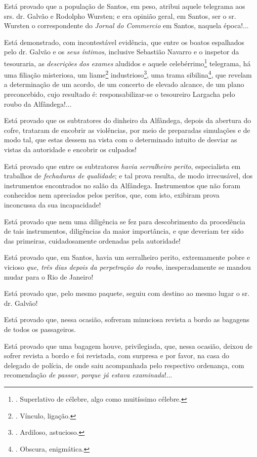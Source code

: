 Está provado que a população de Santos, em peso, atribui aquele
telegrama aos srs. dr. Galvão e Rodolpho Wursten; e era opinião geral,
em Santos, ser o sr. Wursten o correspondente do \emph{Jornal do
Commercio} em Santos, naquela época!...

Está demonstrado, com incontestável evidência, que entre os boatos
espalhados pelo dr. Galvão e os \emph{seus íntimos}, inclusive Sebastião
Navarro e o inspetor da tesouraria, as \emph{descrições dos exames}
aludidos e aquele celebérrimo\footnote{. Superlativo de célebre, algo
  como muitíssimo célebre.} telegrama, há uma filiação misteriosa, um
liame\footnote{. Vínculo, ligação.} industrioso\footnote{. Ardiloso,
  astucioso.}, uma trama sibilina\footnote{. Obscura, enigmática.}, que
revelam a determinação de um acordo, de um concerto de elevado alcance,
de um plano preconcebido, cujo resultado é: responsabilizar-se o
tesoureiro Largacha pelo roubo da Alfândega!...

Está provado que os subtratores do dinheiro da Alfândega, depois da
abertura do cofre, trataram de encobrir as violências, por meio de
preparadas simulações e de modo tal, que estas dessem na vista com o
determinado intuito de desviar as vistas da autoridade e encobrir os
culpados!

Está provado que entre os subtratores \emph{havia serralheiro perito},
especialista em trabalhos de \emph{fechaduras de qualidade}; e tal prova
resulta, de modo irrecusável, dos instrumentos encontrados no salão da
Alfândega. Instrumentos que não foram conhecidos nem apreciados pelos
peritos, que, com isto, exibiram prova inconcussa da sua incapacidade!

Está provado que nem uma diligência se fez para descobrimento da
procedência de tais instrumentos, diligências da maior importância, e
que deveriam ter sido das primeiras, cuidadosamente ordenadas pela
autoridade!

Está provado que, em Santos, havia um serralheiro perito, extremamente
pobre e vicioso \emph{que, três dias depois da perpetração do roubo},
inesperadamente se mandou mudar para o Rio de Janeiro!

Está provado que, pelo mesmo paquete, seguiu com destino ao mesmo lugar
o sr. dr. Galvão!

Está provado que, nessa ocasião, sofreram minuciosa revista a bordo as
bagagens de todos os passageiros.

Está provado que uma bagagem houve, privilegiada, que, nessa ocasião,
deixou de sofrer revista a bordo e foi revistada, com surpresa e por
favor, na casa do delegado de polícia, de onde saiu acompanhada pelo
respectivo ordenança, com recomendação \emph{de passar, porque já estava
examinada}!...

